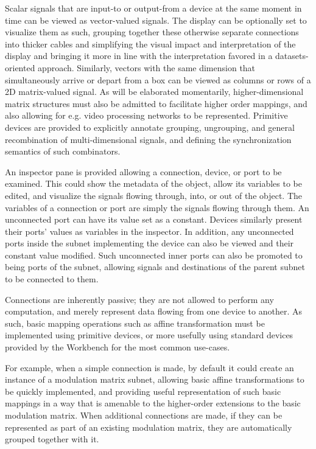 \documentclass[main.tex]{subfiles}
\begin{document}
Scalar signals that are input-to or output-from a device at the same moment in time
can be viewed as vector-valued signals.
The display can be optionally set to visualize them as such, grouping together these
otherwise separate connections into thicker cables and simplifying the visual impact and
interpretation of the display and bringing it more in line with the interpretation
favored in a datasets-oriented approach. Similarly, vectors with the same dimension
that simultaneously arrive or depart from a box can be viewed as columns or rows of
a 2D matrix-valued signal. As will be elaborated momentarily, higher-dimensional matrix structures must also
be admitted to facilitate higher order mappings,
and also allowing for e.g. video processing networks to be represented.
Primitive devices are provided to explicitly annotate grouping, ungrouping, and general recombination of
multi-dimensional signals, and defining the synchronization semantics of such
combinators.

An inspector pane is provided allowing a connection, device, or port to be examined.
This could show the metadata of the object, allow its variables to be edited,
and visualize the signals flowing through, into, or out of the object.
The variables of a connection or port are simply the signals flowing through them.
An unconnected port can have its value set as a constant.
Devices similarly present their ports' values as variables in the inspector.
In addition, any unconnected ports inside the subnet implementing the device
can also be viewed and their constant value modified. Such unconnected inner ports
can also be promoted to being ports of the subnet, allowing signals and destinations of the parent
subnet to be connected to them.

Connections are inherently passive; they are not allowed to perform any computation,
and merely represent data flowing from one device to another. As such, basic
mapping operations such as affine transformation must be implemented using primitive
devices, or more usefully using standard devices provided by the Workbench for the most common use-cases.

For example, when a simple connection is made, by default it could create an instance of a modulation
matrix subnet, allowing basic affine transformations to be quickly implemented,
and providing useful representation of such basic mappings in a way that is amenable
to the higher-order extensions to the basic modulation matrix. When additional connections
are made, if they can be represented as part of an existing modulation matrix, they are
automatically grouped together with it.
\end{document}
